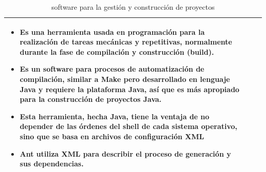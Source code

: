 \begin{table}[b!]
\begin{tabular}{|p{2cm}|ll}
{\begin{itemize}
          \vspace{-27mm}
          \item Es una herramienta usada en programación para la realización de tareas mecánicas y repetitivas, normalmente durante la fase de compilación y construcción (build). 
        \item Es un software para procesos de automatización de compilación, similar a Make pero desarrollado en lenguaje Java y requiere la plataforma Java, así que es más apropiado para la construcción de proyectos Java.
        \item Esta herramienta, hecha Java, tiene la ventaja de no depender de las órdenes del shell de cada sistema operativo, sino que se basa en archivos de configuración XML 
        \item  Ant utiliza XML para describir el proceso de generación y sus dependencias. \cite{37}
      \end{itemize}} \\ 
       \hline
      \end{tabular}
       \caption{ software para la gestión y construcción de proyectos}
      \label{table:Cuadro Comparativo de software para la gestión y construcción de proyectos}
    \end{table}

